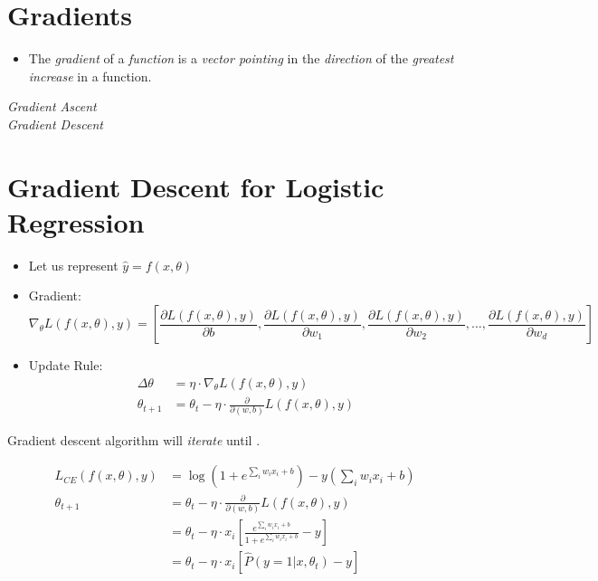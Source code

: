 \documentclass[
	title={Logistic Regression}
]{cs584notes}
\begin{document}
\section{Gradients}\label{sec:gradients}
\begin{itemize}
	\item The \emph{gradient} of a \emph{function} is a \emph{vector pointing} in the \emph{direction} of the \emph{greatest increase} in a function.
\end{itemize}
\begin{description}
	\item[\emph{Gradient Ascent}]
	\item[\emph{Gradient Descent}]
\end{description}

\section{Gradient Descent for Logistic Regression}\label{sec:gradient-descent-for-logistic-regression}
\begin{itemize}
	\item Let us represent $\hat{y}=f(x, \theta)$
	\item Gradient:
	\begin{equation}
		\nabla_{\theta} L(f(x,\theta), y) = \left[ \frac{\partial L(f(x, \theta), y)}{\partial b} , \frac{\partial L(f(x, \theta), y)}{\partial w_{1}}, \frac{\partial L(f(x, \theta), y)}{\partial w_{2}}, \dots, \frac{\partial L(f(x, \theta), y)}{\partial w_{d}} \right]
		\label{eq:gradient}
	\end{equation}
	\item Update Rule:
	\begin{equation}
	\begin{aligned}
		\Delta\theta &= \eta\cdot\nabla_{\theta}L(f(x,\theta), y)\\
		\theta_{t+1} &= \theta_{t} - \eta\cdot\frac{\partial}{\partial (w,b)}L(f(x,\theta), y)
	\end{aligned}
	\label{eq:update-rule}
	\end{equation}
\end{itemize}
Gradient descent algorithm will \emph{iterate} until \data{$\Delta\theta < \epsilon$}.

\begin{equation*}
\begin{aligned}
	L_{CE}(f(x, \theta), y) &= \log\left( 1 + e^{\sum_{i} w_{i}x_{i} + b} \right) - y\left( \sum_{i}w_{i}x_{i} + b \right)\\
	\theta_{t+1} &= \theta_{t} - \eta\cdot\frac{\partial}{\partial (w,b)}L(f(x,\theta), y)\\
				 &= \theta_{t} - \eta\cdot x_{i}\left[ \frac{e^{\sum_{i} w_{i}x_{i} + b}}{1 + e^{\sum_{i} w_{i}x_{i} + b}} - y \right]\\
				 &= \theta_{t} - \eta\cdot x_{i}\left[ \hat{P}(y = 1|x,\theta_{t}) - y \right]
\end{aligned}
\end{equation*}
\end{document}
